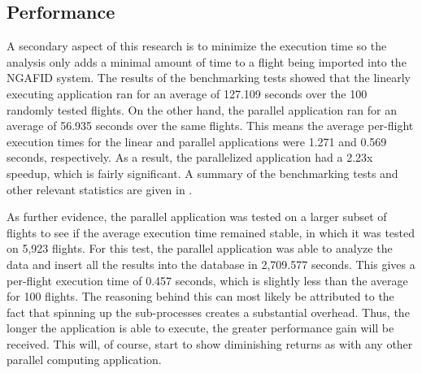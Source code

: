 \subsection{Performance}

	A secondary aspect of this research is to minimize the execution time so the analysis only adds a minimal amount of time to a flight being imported into the NGAFID system.  The results of the benchmarking tests showed that the linearly executing application ran for an average of 127.109 seconds over the 100 randomly tested flights.  On the other hand, the parallel application ran for an average of 56.935 seconds over the same flights.  This means the average per-flight execution times for the linear and parallel applications were 1.271 and 0.569 seconds, respectively.  As a result, the parallelized application had a 2.23x speedup, which is fairly significant.  A summary of the benchmarking tests and other relevant statistics are given in .
    
    As further evidence, the parallel application was tested on a larger subset of flights to see if the average execution time remained stable, in which it was tested on 5,923 flights.  For this test, the parallel application was able to analyze the data and insert all the results into the database in 2,709.577 seconds.  This gives a per-flight execution time of 0.457 seconds, which is slightly less than the average for 100 flights.  The reasoning behind this can most likely be attributed to the fact that spinning up the sub-processes creates a substantial overhead.  Thus, the longer the application is able to execute, the greater performance gain will be received.  This will, of course, start to show diminishing returns as with any other parallel computing application.
    
